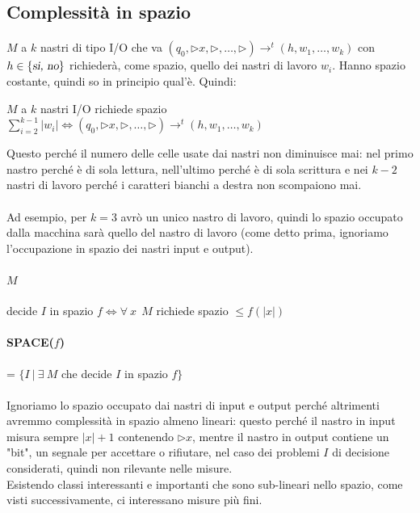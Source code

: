 \documentclass[10pt]{book}
\begin{document}
\subsection{Complessità in spazio}
\paragraph{} $M$ a $k$ nastri di tipo I/O che va $(q_0, \triangleright x, \triangleright, \ldots, \triangleright) \rightarrow^t (h, w_1, \ldots, w_k)$ con $h \in \{\textsl{si, no}\}$ richiederà, come spazio, quello dei nastri di lavoro $w_i$. Hanno spazio costante, quindi so in principio qual'è. Quindi:
\begin{list}{}{}
	\item $M$ a $k$ nastri I/O richiede spazio $\sum_{i=2}^{k-1} |w_i| \Leftrightarrow (q_0, \triangleright x, \triangleright, \ldots, \triangleright) \rightarrow^t (h, w_1, \ldots, w_k)$
\end{list}
Questo perché il numero delle celle usate dai nastri non diminuisce mai: nel primo nastro perché è di sola lettura, nell'ultimo perché è di sola scrittura e nei $k-2$ nastri di lavoro perché i caratteri bianchi a destra non scompaiono mai.\\\\
Ad esempio, per $k = 3$ avrò un unico nastro di lavoro, quindi lo spazio occupato dalla macchina sarà quello del nastro di lavoro (come detto prima, ignoriamo l'occupazione in spazio dei nastri input e output).
\paragraph{$M$} decide $I$ in spazio $f \Leftrightarrow \forall\: x\:\:M$ richiede spazio $\leq f(|x|)$
\paragraph{SPACE($f$)} = $\{I\: |\:\exists\: M$ che decide $I$ in spazio $f\}$
\paragraph{} Ignoriamo lo spazio occupato dai nastri di input e output perché altrimenti avremmo complessità in spazio almeno lineari: questo perché il nastro in input misura sempre $|x| + 1$ contenendo $\triangleright x$, mentre il nastro in output contiene un "bit", un segnale per accettare o rifiutare, nel caso dei problemi $I$ di decisione considerati, quindi non rilevante nelle misure.\\
Esistendo classi interessanti e importanti che sono sub-lineari nello spazio, come visti successivamente, ci interessano misure più fini.
\end{document}

